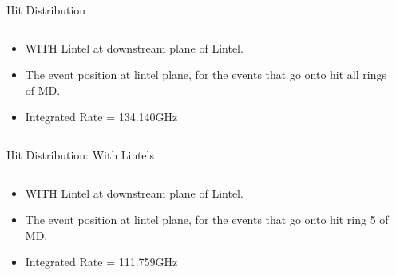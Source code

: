 \documentclass[aspectratio=1610]{beamer}
\begin{document}
\begin{frame}{Hit Distribution}
    \begin{columns}
        \begin{column}{0.39\textwidth}
            \begin{itemize}
                \item WITH Lintel at downstream plane of Lintel.
                \item The event position at lintel plane, for the events that go onto hit all rings of MD.
                \item Integrated Rate = 134.140GHz
            \end{itemize}
        \end{column}
        \begin{column}{0.59\textwidth}
        \end{column}
    \end{columns}
\end{frame}
%
%
%
%
%
\begin{frame}{Hit Distribution: With Lintels}
    \begin{columns}
        \begin{column}{0.39\textwidth}
            \begin{itemize}
                \item WITH Lintel at downstream plane of Lintel.
                \item The event position at lintel plane, for the events that go onto hit ring 5 of MD.
                \item Integrated Rate = 111.759GHz
            \end{itemize}
        \end{column}
        \begin{column}{0.59\textwidth}
        \end{column}
    \end{columns}
\end{frame}
%
\end{document}

